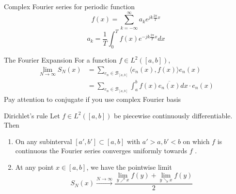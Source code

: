 \documentclass{beamer}
\begin{document}
\begin{frame}
\begin{block}{Complex Fourier series for periodic function}
$$f(x)=\sum\limits_{k=-\infty}^{\infty}a_ke^{jk\frac{2\pi}{T}x}$$
$$a_k=\dfrac{1}{T}\int_{0}^{T}f(x)e^{-jk\frac{2\pi}{T}x}dx$$
\end{block}
\end{frame}

\begin{frame}
\begin{block}{The Fourier Expansion}
For a function $f\in L^2([a,b])$, 
\begin{align*}
\lim\limits_{N\rightarrow\infty}S_N(x)&=\sum\limits_{e_n\in\mathcal{B}_{[a,b]}}\langle e_n(x),f(x) \rangle e_n(x)\\
&=\sum\limits_{e_n\in\mathcal{B}_{[a,b]}}\int_{a}^{b} f(x)\overline{e_n(x)} dx\cdot e_n(x)
\end{align*}
Pay attention to conjugate if you use complex Fourier basis
\end{block}
\end{frame}


\begin{frame}
\begin{block}{Dirichlet's rule}
Let $f \in L^2([a, b])$ be piecewise continuously differentiable. Then
\begin{enumerate}
\item On any subinterval $[a', b'] \subset [a, b]$ with $a' > a, b' < b$ on which $f$ is continuous the Fourier series converges uniformly towards $f$ .
\item At any point $x \in [a, b]$, we have the pointwise limit
$$S_N(x)\xrightarrow{N\rightarrow\infty}\dfrac{\lim\limits_{y\nearrow x}f(y)+\lim\limits_{y\searrow x}f(y)}{2}$$
\end{enumerate}
\end{block}
\end{frame}
\end{document}
